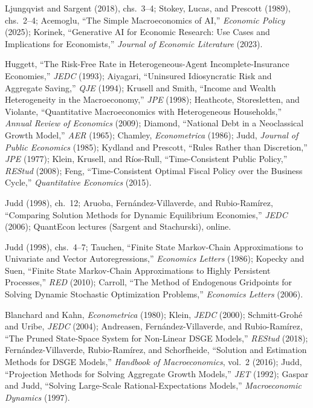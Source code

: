 \documentclass[11pt]{article}
\begin{document}
{\small
\begin{description}[style=nextline, leftmargin=0pt, labelwidth=0pt, itemsep=3pt]
\item[Session 1 --- Introduction; the growth model]
Ljungqvist and Sargent (2018), chs.~3--4; Stokey, Lucas, and Prescott (1989), chs.~2--4; Acemoglu, ``The Simple Macroeconomics of AI,'' \emph{Economic Policy} (2025); Korinek, ``Generative AI for Economic Research: Use Cases and Implications for Economists,'' \emph{Journal of Economic Literature} (2023).

\item[Session 2 --- Heterogeneous agents, OLG, optimal policy]
Huggett, ``The Risk-Free Rate in Heterogeneous-Agent Incomplete-Insurance Economies,'' \emph{JEDC} (1993); Aiyagari, ``Uninsured Idiosyncratic Risk and Aggregate Saving,'' \emph{QJE} (1994); Krusell and Smith, ``Income and Wealth Heterogeneity in the Macroeconomy,'' \emph{JPE} (1998); Heathcote, Storesletten, and Violante, ``Quantitative Macroeconomics with Heterogeneous Households,'' \emph{Annual Review of Economics} (2009); Diamond, ``National Debt in a Neoclassical Growth Model,'' \emph{AER} (1965); Chamley, \emph{Econometrica} (1986); Judd, \emph{Journal of Public Economics} (1985); Kydland and Prescott, ``Rules Rather than Discretion,'' \emph{JPE} (1977); Klein, Krusell, and R\'ios-Rull, ``Time-Consistent Public Policy,'' \emph{REStud} (2008); Feng, ``Time-Consistent Optimal Fiscal Policy over the Business Cycle,'' \emph{Quantitative Economics} (2015).

\item[Session 3 --- Computation and programming]
Judd (1998), ch.~12; Aruoba, Fern\'andez-Villaverde, and Rubio-Ram\'irez, ``Comparing Solution Methods for Dynamic Equilibrium Economies,'' \emph{JEDC} (2006); QuantEcon lectures (Sargent and Stachurski), online.

\item[Session 4 --- Numerical methods I]
Judd (1998), chs.~4--7; Tauchen, ``Finite State Markov-Chain Approximations to Univariate and Vector Autoregressions,'' \emph{Economics Letters} (1986); Kopecky and Suen, ``Finite State Markov-Chain Approximations to Highly Persistent Processes,'' \emph{RED} (2010); Carroll, ``The Method of Endogenous Gridpoints for Solving Dynamic Stochastic Optimization Problems,'' \emph{Economics Letters} (2006).

\item[Session 5 --- Numerical methods II]
Blanchard and Kahn, \emph{Econometrica} (1980); Klein, \emph{JEDC} (2000); Schmitt-Groh\'e and Uribe, \emph{JEDC} (2004); Andreasen, Fern\'andez-Villaverde, and Rubio-Ram\'irez, ``The Pruned State-Space System for Non-Linear DSGE Models,'' \emph{REStud} (2018); Fern\'andez-Villaverde, Rubio-Ram\'irez, and Schorfheide, ``Solution and Estimation Methods for DSGE Models,'' \emph{Handbook of Macroeconomics}, vol.~2 (2016); Judd, ``Projection Methods for Solving Aggregate Growth Models,'' \emph{JET} (1992); Gaspar and Judd, ``Solving Large-Scale Rational-Expectations Models,'' \emph{Macroeconomic Dynamics} (1997).


\end{description}}
\end{document}
